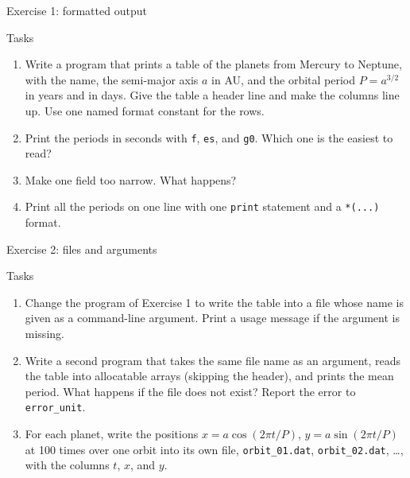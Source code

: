\begin{frame}{Exercise 1: formatted output}
  \begin{block}{Tasks}
    \begin{enumerate}
      \item Write a program that prints a table of the planets from Mercury to Neptune, with the name, the semi-major axis $a$ in AU, and the orbital period $P = a^{3/2}$ in years and in days. Give the table a header line and make the columns line up. Use one named format constant for the rows.
      \item Print the periods in seconds with \texttt{f}, \texttt{es}, and \texttt{g0}. Which one is the easiest to read?
      \item Make one field too narrow. What happens?
      \item Print all the periods on one line with one \texttt{print} statement and a \texttt{*(...)} format.
    \end{enumerate}
  \end{block}
\end{frame}


\begin{frame}{Exercise 2: files and arguments}
  \begin{block}{Tasks}
    \begin{enumerate}
      \item Change the program of Exercise 1 to write the table into a file whose name is given as a command-line argument. Print a usage message if the argument is missing.
      \item Write a second program that takes the same file name as an argument, reads the table into allocatable arrays (skipping the header), and prints the mean period. What happens if the file does not exist? Report the error to \texttt{error\_unit}.
      \item For each planet, write the positions $x = a \cos(2 \pi t / P)$, $y = a \sin(2 \pi t / P)$ at 100 times over one orbit into its own file, \texttt{orbit\_01.dat}, \texttt{orbit\_02.dat}, \ldots, with the columns $t$, $x$, and $y$.
    \end{enumerate}
  \end{block}
\end{frame}


